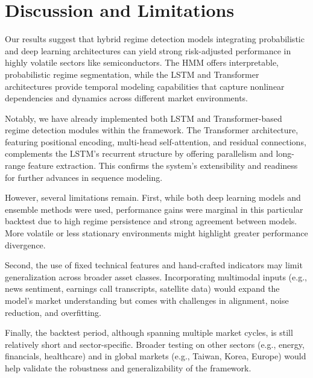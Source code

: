 \section{Discussion and Limitations}
Our results suggest that hybrid regime detection models integrating probabilistic and deep learning architectures can yield strong risk-adjusted performance in highly volatile sectors like semiconductors. The HMM offers interpretable, probabilistic regime segmentation, while the LSTM and Transformer architectures provide temporal modeling capabilities that capture nonlinear dependencies and dynamics across different market environments.

Notably, we have already implemented both LSTM and Transformer-based regime detection modules within the framework. The Transformer architecture, featuring positional encoding, multi-head self-attention, and residual connections, complements the LSTM's recurrent structure by offering parallelism and long-range feature extraction. This confirms the system’s extensibility and readiness for further advances in sequence modeling.

However, several limitations remain. First, while both deep learning models and ensemble methods were used, performance gains were marginal in this particular backtest due to high regime persistence and strong agreement between models. More volatile or less stationary environments might highlight greater performance divergence.

Second, the use of fixed technical features and hand-crafted indicators may limit generalization across broader asset classes. Incorporating multimodal inputs (e.g., news sentiment, earnings call transcripts, satellite data) would expand the model’s market understanding but comes with challenges in alignment, noise reduction, and overfitting.

Finally, the backtest period, although spanning multiple market cycles, is still relatively short and sector-specific. Broader testing on other sectors (e.g., energy, financials, healthcare) and in global markets (e.g., Taiwan, Korea, Europe) would help validate the robustness and generalizability of the framework.

